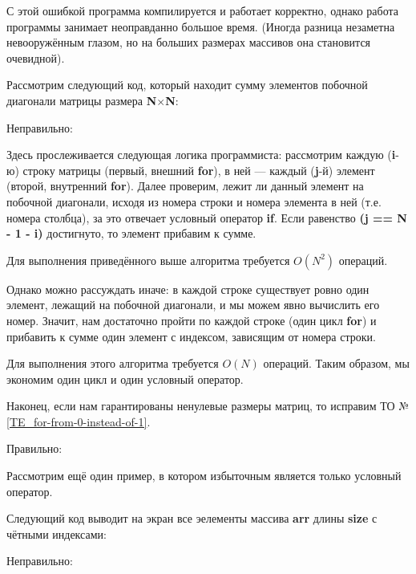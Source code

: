 \begin{typerror}
	\label{TE_excessive-for-if}

	С этой ошибкой программа компилируется и работает корректно,
	однако работа программы занимает неоправданно большое время.
	(Иногда разница незаметна невооружённым глазом, но на больших
	размерах массивов она становится очевидной).

	Рассмотрим следующий код, который находит сумму элементов
	побочной диагонали матрицы размера \textbf{N$\times$N}:

	Неправильно:

	Здесь прослеживается следующая логика программиста:
	рассмотрим каждую (\textbf{i}-ю) строку матрицы (первый, внешний \textbf{for}),
	в ней --- каждый (\textbf{j}-й) элемент (второй, внутренний \textbf{for}).
	Далее проверим, лежит ли данный элемент на побочной диагонали,
	исходя из номера строки и номера элемента в ней (т.е. номера столбца),
	за это отвечает условный оператор \textbf{if}.
	Если равенство \textbf{(j == N - 1 - i)} достигнуто, то элемент прибавим к сумме.

	Для выполнения приведённого выше алгоритма требуется $O(N^2)$ операций.

	Однако можно рассуждать иначе:
	в каждой строке существует ровно один элемент, лежащий на побочной диагонали,
	и мы можем явно вычислить его номер.
	Значит, нам достаточно пройти по каждой строке (один цикл \textbf{for})
	и прибавить к сумме один элемент с индексом, зависящим от номера строки.


	Для выполнения этого алгоритма требуется $O(N)$ операций.
	Таким образом, мы экономим один цикл и один условный оператор.

	Наконец, если нам гарантированы ненулевые размеры матриц,
	то исправим ТО №\ref{TE_for-from-0-instead-of-1}.

	Правильно:

	Рассмотрим ещё один пример, в котором избыточным является только условный оператор.

	Следующий код выводит на экран все эелементы массива \textbf{arr} длины \textbf{size}
	с чётными индексами:

	Неправильно:


\end{typerror}
